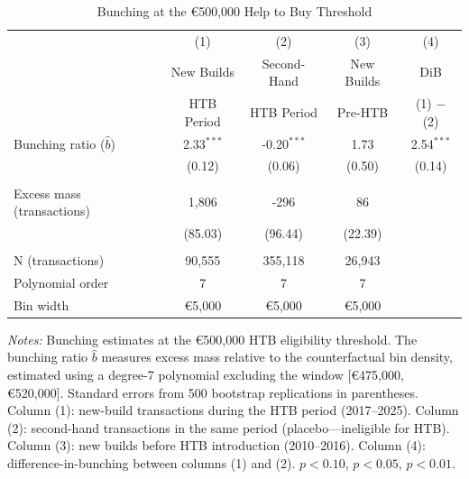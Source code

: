 \begin{table}[H]
\centering
\caption{Bunching at the \euro{}500,000 Help to Buy Threshold}
\label{tab:bunching}
\begin{threeparttable}
\begin{tabular}{lcccc}
\toprule
 & (1) & (2) & (3) & (4) \\
 & New Builds & Second-Hand & New Builds & DiB \\
 & HTB Period & HTB Period & Pre-HTB & (1) $-$ (2) \\
\midrule
Bunching ratio ($\hat{b}$) & 2.33$^{***}$ & -0.20$^{***}$ & 1.73 & 2.54$^{***}$ \\
 & (0.12) & (0.06) & (0.50) & (0.14) \\
\\
Excess mass (transactions) & 1,806 & -296 & 86 & \\
 & (85.03) & (96.44) & (22.39) & \\
\\
N (transactions) & 90,555 & 355,118 & 26,943 & \\
Polynomial order & 7 & 7 & 7 & \\
Bin width & \euro{}5,000 & \euro{}5,000 & \euro{}5,000 & \\
\bottomrule
\end{tabular}
\begin{tablenotes}[flushleft]
\small
\item \textit{Notes:} Bunching estimates at the \euro{}500,000 HTB eligibility threshold. The bunching ratio $\hat{b}$ measures excess mass relative to the counterfactual bin density, estimated using a degree-7 polynomial excluding the window [\euro{}475,000, \euro{}520,000]. Standard errors from 500 bootstrap replications in parentheses. Column (1): new-build transactions during the HTB period (2017--2025). Column (2): second-hand transactions in the same period (placebo---ineligible for HTB). Column (3): new builds before HTB introduction (2010--2016). Column (4): difference-in-bunching between columns (1) and (2). \sym{*} $p<0.10$, \sym{**} $p<0.05$, \sym{***} $p<0.01$.
\end{tablenotes}
\end{threeparttable}
\end{table}
